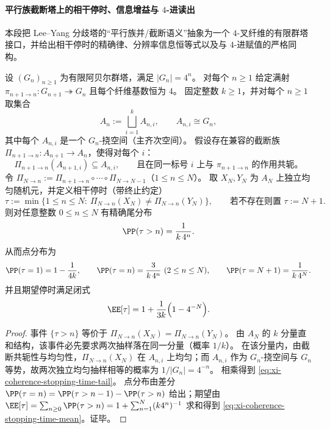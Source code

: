 \paragraph{平行族截断塔上的相干停时、信息增益与 \(4\)-进读出}\label{par:xi-terminal-zm-leyang-coherence-stopping-time}
本段把 Lee--Yang 分歧塔的“平行族并/截断语义”抽象为一个 \(4\)-叉纤维的有限群塔接口，并给出相干停时的精确律、分辨率信息恒等式以及与 \(4\)-进赋值的严格同构。

\begin{theorem}\label{thm:xi-coherence-stopping-time-k-parallel-4ary}
设 \((G_n)_{n\ge 1}\) 为有限阿贝尔群塔，满足 \(|G_n|=4^n\)。
对每个 \(n\ge 1\) 给定满射
\(
\pi_{n+1\to n}:G_{n+1}\twoheadrightarrow G_n
\)
且每个纤维基数恒为 \(4\)。
固定整数 \(k\ge 1\)，并对每个 \(n\ge 1\) 取集合
\[
A_n:=\bigsqcup_{i=1}^{k}A_{n,i},
\qquad
A_{n,i}\cong G_n,
\]
其中每个 \(A_{n,i}\) 是一个 \(G_n\)-挠空间（主齐次空间）。
假设存在兼容的截断族 \(\Pi_{n+1\to n}:A_{n+1}\to A_n\)，使得对每个 \(i\)：
\[
\Pi_{n+1\to n}(A_{n+1,i})\subseteq A_{n,i},
\qquad
\text{且在同一标号 \(i\) 上与 }\pi_{n+1\to n}\text{ 的作用共轭。}
\]
令 \(\Pi_{N\to n}:=\Pi_{n+1\to n}\circ\cdots\circ\Pi_{N\to N-1}\)（\(1\le n\le N\)）。
取 \(X_N,Y_N\) 为 \(A_N\) 上独立均匀随机元，并定义相干停时（带终止约定）
\[
\tau:=\min\{1\le n\le N:\ \Pi_{N\to n}(X_N)\neq \Pi_{N\to n}(Y_N)\},
\qquad
\text{若不存在则置 }\tau:=N+1.
\]
则对任意整数 \(0\le n\le N\) 有精确尾分布
\begin{equation}\label{eq:xi-coherence-stopping-time-tail}
\PP(\tau>n)=\frac{1}{k\,4^n}.
\end{equation}
从而点分布为
\[
\PP(\tau=1)=1-\frac{1}{4k},\qquad
\PP(\tau=n)=\frac{3}{k\,4^n}\ (2\le n\le N),\qquad
\PP(\tau=N+1)=\frac{1}{k\,4^N}.
\]
并且期望停时满足闭式
\begin{equation}\label{eq:xi-coherence-stopping-time-mean}
\EE[\tau]=1+\frac{1}{3k}\Bigl(1-4^{-N}\Bigr).
\end{equation}
\end{theorem}
\begin{proof}
事件 \(\{\tau>n\}\) 等价于 \(\Pi_{N\to n}(X_N)=\Pi_{N\to n}(Y_N)\)。
由 \(A_N\) 的 \(k\) 分量直和结构，该事件必先要求两次抽样落在同一分量（概率 \(1/k\)）。
在该分量内，由截断共轭性与均匀性，\(\Pi_{N\to n}(X_N)\) 在 \(A_{n,i}\) 上均匀；而 \(A_{n,i}\) 作为 \(G_n\)-挠空间与 \(G_n\) 等势，故两次独立均匀抽样相等的概率为 \(1/|G_n|=4^{-n}\)。
相乘得到 \eqref{eq:xi-coherence-stopping-time-tail}。
点分布由差分 \(\PP(\tau=n)=\PP(\tau>n-1)-\PP(\tau>n)\) 给出；期望由
\(
\EE[\tau]=\sum_{n\ge 0}\PP(\tau>n)=1+\sum_{n=1}^{N}(k4^n)^{-1}
\)
求和得到 \eqref{eq:xi-coherence-stopping-time-mean}。证毕。
\end{proof}

